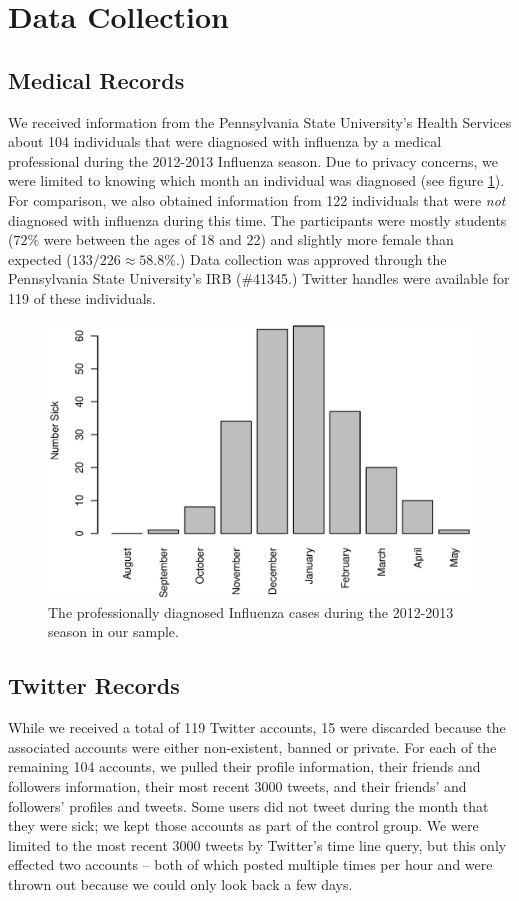 \documentclass{acm_proc_article-sp}
\begin{document}

\section{Data Collection}
\subsection{Medical Records}
We received information from the Pennsylvania State University's Health Services about 104 individuals that were diagnosed with influenza by a medical professional during the 2012-2013 Influenza season. Due to privacy concerns, we were limited to knowing which month an individual was diagnosed (see figure \ref{fig:flu_rate}).  For comparison, we also obtained information from 122 individuals that were \emph{not} diagnosed with influenza during this time. The participants were mostly students (\(72\%\) were between the ages of 18 and 22) and slightly more female than expected (\(133 / 226 \approx 58.8\%\).) Data collection was approved through the Pennsylvania State University's IRB (\#41345.) Twitter handles were available for 119 of these individuals.

\begin{figure} [h]
\centering
\includegraphics[width=.45\textwidth]{figs/sick_count.eps}
\caption{The professionally diagnosed Influenza cases during the 2012-2013 season in our sample.}
\label{fig:flu_rate}
\end{figure}

\subsection{Twitter Records}
While we received a total of 119 Twitter accounts, 15 were discarded because the associated accounts were either non-existent, banned or private. For each of the remaining 104 accounts, we pulled their profile information, their friends and followers information, their most recent 3000 tweets, and their friends' and followers' profiles and tweets. Some users did not tweet during the month that they were sick; we kept those accounts as part of the control group. We were limited to the most recent 3000 tweets by Twitter's time line query, but this only effected two accounts -- both of which posted multiple times per hour and were thrown out because we could only look back a few days.
\end{document}
